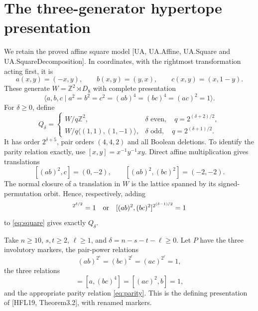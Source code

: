 \documentclass[11pt,a4paper]{article}
\theoremstyle{remark}\newtheorem{remark}[theorem]{Remark}
\newcommand{\gen}[1]{\langle #1\rangle}
\newcommand{\Z}{\mathbb Z}
\begin{document}
\section{The three-generator hypertope presentation}
We retain the proved affine square model [UA, UA.Affine, UA.Square and
UA.SquareDecomposition]. In coordinates, with the rightmost transformation
acting first, it is
\[
 a(x,y)=(-x,y),\qquad b(x,y)=(y,x),\qquad c(x,y)=(x,1-y).
\]
These generate $W=\Z^2\rtimes D_8$ with complete presentation
\begin{equation}
 \gen{a,b,c\mid a^2=b^2=c^2=(ab)^4=(bc)^4=(ac)^2=1}.           \label{eq:square}
\end{equation}
For $\delta\geq0$, define
\[
 Q_\delta=\begin{cases}
 W/q\Z^2,&\delta\text{ even},\quad q=2^{(\delta+2)/2},\\
 W/q\gen{(1,1),(1,-1)},&\delta\text{ odd},\quad q=2^{(\delta+1)/2}.
 \end{cases}
\]
It has order $2^{\delta+5}$, pair orders $(4,4,2)$ and all Boolean deletions.
To identify the parity relation exactly, use $[x,y]=x^{-1}y^{-1}xy$.
Direct affine multiplication gives translations
\[
 [(ab)^2,c]=(0,-2),\qquad [(ab)^2,(bc)^2]=(-2,-2).
\]
The normal closure of a translation in $W$ is the lattice spanned by its
signed-permutation orbit. Hence, respectively, adding
\begin{equation}
 [(ab)^2,c]^{2^{\delta/2}}=1\quad\hbox{or}\quad
 [(ab)^2,(bc)^2]^{2^{(\delta-1)/2}}=1                          \label{eq:parity}
\end{equation}
to \eqref{eq:square} gives exactly $Q_\delta$.

Take $n\geq10$, $s,t\geq2$, $\ell\geq1$, and
$\delta=n-s-t-\ell\geq0$. Let $P$ have the three involutory markers,
the pair-power relations
\[
 (ab)^{2^s}=(bc)^{2^t}=(ac)^{2^\ell}=1,
\]
the three relations
\begin{equation}
 [(ab)^4,c]=[a,(bc)^4]=[(ac)^2,b]=1,                           \label{eq:normal}
\end{equation}
and the appropriate parity relation \eqref{eq:parity}. This is the defining
presentation of [HFL19, Theorem3.2], with renamed markers.
\end{document}
